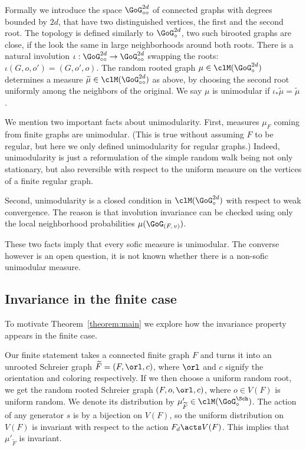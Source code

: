 Formally we introduce the space $\GoG_{\circ\circ}^{2d}$ of connected graphs with degrees bounded by $2d$, that have two distinguished vertices, the first and the second root. The topology is defined similarly to $\GoG_{\circ}^{2d}$, two such birooted graphs are close, if the look the same in large neighborhoods around both roots. There is a natural involution $\iota: \GoG_{\circ\circ}^{2d} \to \GoG_{\circ\circ}^{2d}$ swapping the roots: $\iota (G,o,o') = (G,o',o)$. The random rooted graph $\mu \in \clM(\GoG_{\circ}^{2d})$ determines a measure $\widetilde{\mu} \in \clM(\GoG_{\circ\circ}^{2d})$ as above, by choosing the second root uniformly among the neighbors of the original. We say $\mu$ is unimodular if $\iota_{*}\widetilde{\mu}=\widetilde{\mu}$.

We mention two important facts about unimodularity. First, measures $\mu_F$ coming from finite graphs are unimodular. (This is true without assuming $F$ to be regular, but here we only defined unimodularity for regular graphs.) Indeed, unimodularity is just a reformulation of the simple random walk being not only stationary, but also reversible with respect to the uniform measure on the vertices of a finite regular graph.

Second, unimodularity is a closed condition in $\clM(\GoG_{\circ}^{2d})$ with respect to weak convergence. The reason is that involution invariance can be checked using only the local neighborhood probabilities $\mu(\GoG_{(F,\,v)})$.

These two facts imply that every sofic measure is unimodular. The converse however is an open question, it is not known whether there is a non-sofic unimodular measure.


\subsection{Invariance in the finite case}
To motivate Theorem~\ref{theorem:main} we explore how the invariance property appears in the finite case.

Our finite statement takes a connected finite graph $F$ and turns it into an unrooted Schreier graph $\widetilde{F}=(F, \orl, c)$, where $\orl$ and $c$ signify the orientation and coloring respectively. If we then choose a uniform random root, we get the random rooted Schreier graph $(F, o, \orl, c)$, where $o \in V(F)$ is uniform random. We denote its distribution by $\mu'_{\widetilde{F}} \in \clM(\GoG_{\circ}^{\Sch})$. The action of any generator $s$ is by a bijection on $V(F)$, so the uniform distribution on $V(F)$ is invariant with respect to the action $F_d \acts V(F)$. This implies that $\mu'_{\widetilde{F}}$ is invariant.


